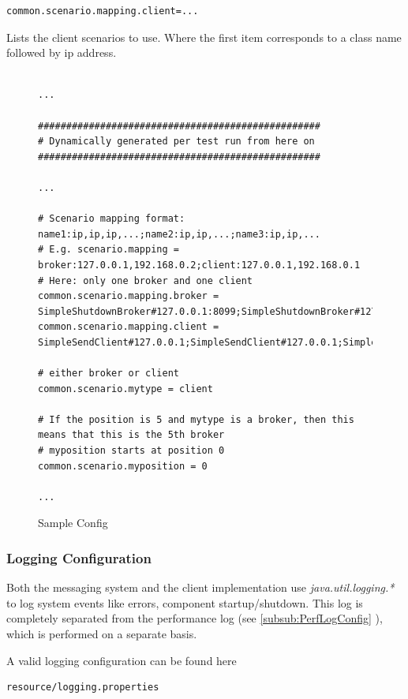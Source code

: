 \documentclass[a4paper]{article}
\begin{document}
\begin{verbatim} 
common.scenario.mapping.client=...
\end{verbatim}
Lists the client scenarios to use. Where the first item corresponds to a class name followed by ip address.

\begin{figure}[H]
\begin{verbatim} 

...

##################################################
# Dynamically generated per test run from here on
##################################################

...

# Scenario mapping format: name1:ip,ip,ip,...;name2:ip,ip,...;name3:ip,ip,...
# E.g. scenario.mapping = broker:127.0.0.1,192.168.0.2;client:127.0.0.1,192.168.0.1
# Here: only one broker and one client
common.scenario.mapping.broker = SimpleShutdownBroker#127.0.0.1:8099;SimpleShutdownBroker#127.0.0.1:8100,127.0.0.1:8101
common.scenario.mapping.client = SimpleSendClient#127.0.0.1;SimpleSendClient#127.0.0.1;SimpleSendClient#127.0.0.1;SimpleSendClient#127.0.0.1,127.0.0.1

# either broker or client
common.scenario.mytype = client

# If the position is 5 and mytype is a broker, then this means that this is the 5th broker
# myposition starts at position 0
common.scenario.myposition = 0

...

\end{verbatim}
\caption{Sample Config}
\label{fig:SampleConfig}
\end{figure}  	

\subsubsection{Logging Configuration}
\label{subsub:loggingConfig}
Both the messaging system and the client implementation use \textit{java.util.logging.*} to log system events like errors, component startup/shutdown. This log is completely separated from the performance log (see \ref{subsub:PerfLogConfig} ), which is performed on a separate basis.

A valid logging configuration can be found here

\begin{verbatim} 
resource/logging.properties
\end{verbatim}
\end{document}

